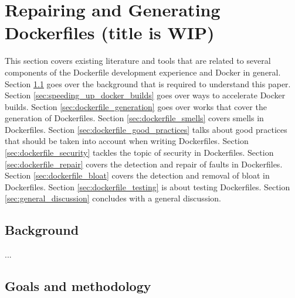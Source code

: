 \chapter{Repairing and Generating Dockerfiles (title is WIP)} \label{chap:sota}

This section covers existing literature and tools that are related to several components of the Dockerfile development experience and Docker in general. Section \ref{sec:background} goes over the background that is required to understand this paper. Section \ref{sec:speeding_up_docker_builds} goes over ways to accelerate Docker builds. Section \ref{sec:dockerfile_generation} goes over works that cover the generation of Dockerfiles. Section \ref{sec:dockerfile_smells} covers smells in Dockerfiles. Section \ref{sec:dockerfile_good_practices} talks about good practices that should be taken into account when writing Dockerfiles. Section \ref{sec:dockerfile_security} tackles the topic of security in Dockerfiles. Section \ref{sec:dockerfile_repair} covers the detection and repair of faults in Dockerfiles. Section \ref{sec:dockerfile_bloat} covers the detection and removal of bloat in Dockerfiles. Section \ref{sec:dockerfile_testing} is about testing Dockerfiles. Section \ref{sec:general_discussion} concludes with a general discussion.


\section{Background} \label{sec:background}
...

\section{Goals and methodology}


